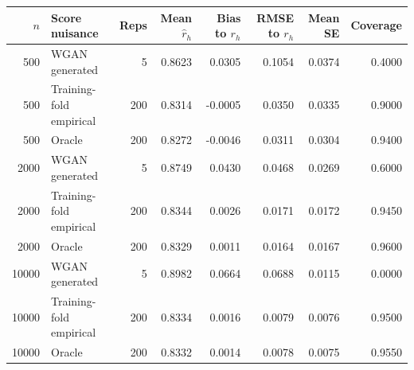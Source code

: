 \begin{tabular}{rlrrrrrr}
\toprule
$n$ & Score nuisance & Reps & Mean $\widehat r_h$ & Bias to $r_h$ & RMSE to $r_h$ & Mean SE & Coverage \\
\midrule
500 & WGAN generated & 5 & 0.8623 & 0.0305 & 0.1054 & 0.0374 & 0.4000 \\
500 & Training-fold empirical & 200 & 0.8314 & -0.0005 & 0.0350 & 0.0335 & 0.9000 \\
500 & Oracle & 200 & 0.8272 & -0.0046 & 0.0311 & 0.0304 & 0.9400 \\
2000 & WGAN generated & 5 & 0.8749 & 0.0430 & 0.0468 & 0.0269 & 0.6000 \\
2000 & Training-fold empirical & 200 & 0.8344 & 0.0026 & 0.0171 & 0.0172 & 0.9450 \\
2000 & Oracle & 200 & 0.8329 & 0.0011 & 0.0164 & 0.0167 & 0.9600 \\
10000 & WGAN generated & 5 & 0.8982 & 0.0664 & 0.0688 & 0.0115 & 0.0000 \\
10000 & Training-fold empirical & 200 & 0.8334 & 0.0016 & 0.0079 & 0.0076 & 0.9500 \\
10000 & Oracle & 200 & 0.8332 & 0.0014 & 0.0078 & 0.0075 & 0.9550 \\
\bottomrule
\end{tabular}
